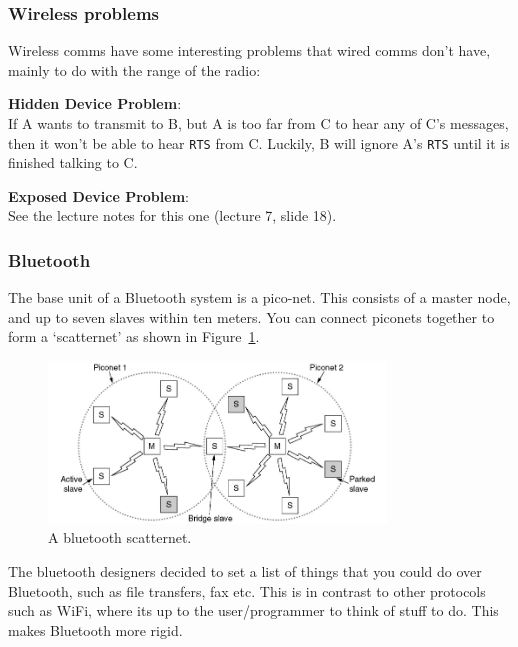 \subsubsection{Wireless problems}

Wireless comms have some interesting problems that wired comms don't have,
mainly to do with the range of the radio:

\begin{description}
  \item \textbf{Hidden Device Problem}:\\
    If A wants to transmit to B, but A is too far from C to hear any of C's
    messages, then it won't be able to hear \texttt{RTS} from C. Luckily, B
    will ignore A's \texttt{RTS} until it is finished talking to C.
  \item \textbf{Exposed Device Problem}:\\
    See the lecture notes for this one (lecture 7, slide 18).
\end{description}

\subsubsection{Bluetooth}

The base unit of a Bluetooth system is a pico-net. This consists of a master
node, and up to seven slaves within ten meters. You can connect piconets
together to form a `scatternet' as shown in Figure~\ref{scatternet}.

\begin{figure}
  \centering
  \includegraphics[width=0.8\textwidth]{images/scatternet}
  \caption{A bluetooth scatternet.}
  \label{scatternet}
\end{figure}

The bluetooth designers decided to set a list of things that you could do over
Bluetooth, such as file transfers, fax etc. This is in contrast to other
protocols such as WiFi, where its up to the user/programmer to think of stuff to
do. This makes Bluetooth more rigid.

